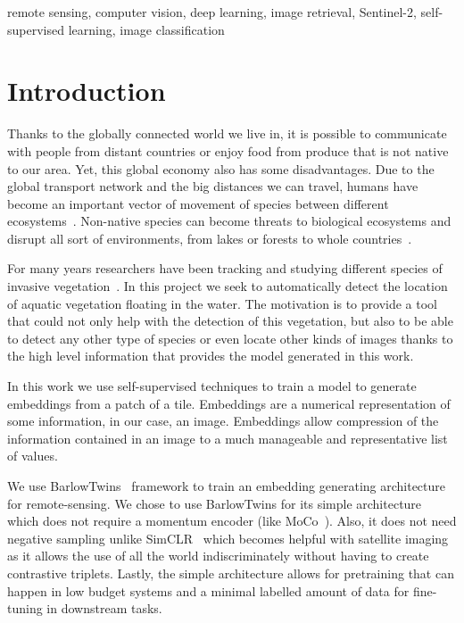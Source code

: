 \documentclass[conference]{IEEEtran}
\begin{document}
    \begin{IEEEkeywords}
        remote sensing, computer vision, deep learning, image retrieval, Sentinel-2, self-supervised learning, image classification
    \end{IEEEkeywords}


    \section{Introduction}
    Thanks to the globally connected world we live in, it is possible to communicate with people from distant countries or
    enjoy food from produce that is not native to our area.
    Yet, this global economy also has some disadvantages.
    Due to the global transport network and the big distances we can travel, humans have become an important vector of movement of species
    between different ecosystems~\cite{invasive_species}.
    Non-native species can become threats to biological ecosystems and disrupt all sort of environments,
    from lakes or forests to whole countries~\cite{bhlitem21490}.

    For many years researchers have been tracking and studying different species of invasive vegetation~\cite{huang2009applications, aguir2013, donyana1, donyana2}.
    In this project we seek to automatically detect the location of aquatic vegetation floating in the water.
    The motivation is to provide a tool that could not only help with the detection of this vegetation, but also to be able to detect
    any other type of species or even locate other kinds of images thanks to the high level information that provides the model generated in this work.

    In this work we use self-supervised techniques to train a model to generate embeddings from a patch of a tile.
    Embeddings are a numerical representation of some information, in our case, an image.
    Embeddings allow compression of the information contained in an image to a much manageable and representative list of values.

    We use BarlowTwins~\cite{barlowtwins} framework to train an embedding generating architecture for remote-sensing.
    We chose to use BarlowTwins for its simple architecture which does not require a momentum encoder (like MoCo~\cite{he2020momentum, grill2020bootstrap}).
    Also, it does not need negative sampling unlike SimCLR~\cite{chen2020simple} which becomes helpful with satellite imaging as it allows the use
    of all the world indiscriminately without having to create contrastive triplets.
    Lastly, the simple architecture allows for pretraining that can happen in low budget systems and a minimal labelled amount of data for fine-tuning in downstream tasks.
\end{document}
